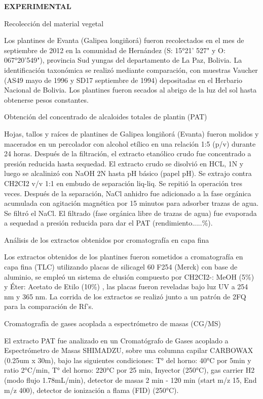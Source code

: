 \documentclass{article}
\begin{document}
\textbf{EXPERIMENTAL}

Recolección del material vegetal

Los plantines de Evanta (Galipea longiñorá) fueron recolectados en el mes de
septiembre de 2012 en la comunidad de Hernández (S: 15°21' 527" y O:
067°20'549"), provincia Sud yungas del departamento de La Paz, Bolivia. La
identificación taxonómica se realizó mediante comparación, con muestras Vaucher
(AS49 mayo de 1996 y SD17 septiembre de 1994) depositadas en el Herbario
Nacional de Bolivia. Los plantines fueron secados al abrigo de la luz del sol
hasta obtenerse pesos constantes.

Obtención del concentrado de alcaloides totales de plantin (PAT)

Hojas, tallos y raíces de plantines de Galipea longiñorá (Evanta) fueron molidos
y macerados en un percolador con alcohol etílico en una relación 1:5 (p/v)
durante 24 horas. Después de la filtración, el extracto etanólico crudo fue
concentrado a presión reducida hasta sequedad. El extracto crudo se disolvió en
HCL, 1N y luego se alcalinizó con NaOH 2N hasta pH básico (papel pH). Se extrajo
contra CH2CI2 v/v 1:1 en embudo de separación liq-liq. Se repitió la operación
tres veces. Después de la separación, NaCl anhidro fue adicionado a la fase
orgánica acumulada con agitación magnética por 15 minutos para adsorber trazas
de agua. Se filtró el NaCl. El filtrado (fase orgánica libre de trazas de agua)
fue evaporada a sequedad a presión reducida para dar el PAT
(rendimiento.....\%).

Análisis de los extractos obtenidos por cromatografía en capa fina

Los extractos obtenidos de los plantines fueron sometidos a cromatografía en
capa fina (TLC) utilizando placas de silicagel 60 F254 (Merck) con base de
aluminio, se empleó un sistema de elusión compuesto por CH2CI2-: MeOH (5\%) y
Éter: Acetato de Etilo (10\%) , las placas fueron reveladas bajo luz UV a 254 nm
y 365 nm. La corrida de los extractos se realizó junto a un patrón de 2FQ para
la comparación de Rf's.

Cromatografía de gases acoplada a espectrómetro de masas (CG/MS)

El extracto PAT fue analizado en un Cromatógrafo de Gases acoplado a
Espectrómetro de Masas SHIMADZU, sobre una columna capilar CARBOWAX (0.25um x
30m), bajo las siguientes condiciones: T° del horno: 40°C por 5min y ratio
2°C/min, T° del horno: 220°C por 25 min, Inyector (250°C), gas carrier H2 (modo
flujo 1.78mL/min), detector de masas 2 min - 120 min (start m/z 15, End m/z
400), detector de ionización a flama (FID) (250°C).
\end{document}
